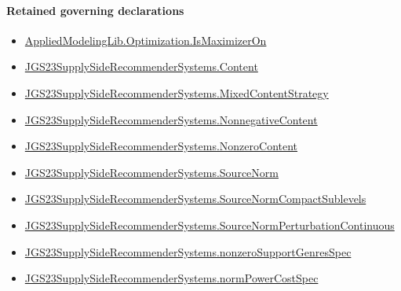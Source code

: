 \documentclass[10pt]{article}
\begin{document}
\paragraph{Retained governing declarations}
\begin{itemize}\raggedright
\item \hyperlink{governing-declaration-67616b2feb727132}{Applied\allowbreak{}Modeling\allowbreak{}Lib.\allowbreak{}Optimization.\allowbreak{}Is\allowbreak{}Maximizer\allowbreak{}On}
\item \hyperlink{governing-declaration-367305fda50f0ada}{JGS23\allowbreak{}Supply\allowbreak{}Side\allowbreak{}Recommender\allowbreak{}Systems.\allowbreak{}Content}
\item \hyperlink{governing-declaration-2089965d06cf0282}{JGS23\allowbreak{}Supply\allowbreak{}Side\allowbreak{}Recommender\allowbreak{}Systems.\allowbreak{}Mixed\allowbreak{}Content\allowbreak{}Strategy}
\item \hyperlink{governing-declaration-d426babe40b9593c}{JGS23\allowbreak{}Supply\allowbreak{}Side\allowbreak{}Recommender\allowbreak{}Systems.\allowbreak{}Nonnegative\allowbreak{}Content}
\item \hyperlink{governing-declaration-90e2ac7d13788c50}{JGS23\allowbreak{}Supply\allowbreak{}Side\allowbreak{}Recommender\allowbreak{}Systems.\allowbreak{}Nonzero\allowbreak{}Content}
\item \hyperlink{governing-declaration-6141339a5d3412d9}{JGS23\allowbreak{}Supply\allowbreak{}Side\allowbreak{}Recommender\allowbreak{}Systems.\allowbreak{}Source\allowbreak{}Norm}
\item \hyperlink{governing-declaration-0d92048317064110}{JGS23\allowbreak{}Supply\allowbreak{}Side\allowbreak{}Recommender\allowbreak{}Systems.\allowbreak{}Source\allowbreak{}Norm\allowbreak{}Compact\allowbreak{}Sublevels}
\item \hyperlink{governing-declaration-6ccc463be39b315f}{JGS23\allowbreak{}Supply\allowbreak{}Side\allowbreak{}Recommender\allowbreak{}Systems.\allowbreak{}Source\allowbreak{}Norm\allowbreak{}Perturbation\allowbreak{}Continuous}
\item \hyperlink{governing-declaration-588c7a0b2af225d7}{JGS23\allowbreak{}Supply\allowbreak{}Side\allowbreak{}Recommender\allowbreak{}Systems.\allowbreak{}nonzero\allowbreak{}Support\allowbreak{}Genres\allowbreak{}Spec}
\item \hyperlink{governing-declaration-6ba13dc1cae95e6e}{JGS23\allowbreak{}Supply\allowbreak{}Side\allowbreak{}Recommender\allowbreak{}Systems.\allowbreak{}norm\allowbreak{}Power\allowbreak{}Cost\allowbreak{}Spec}

\end{itemize}
\end{document}
